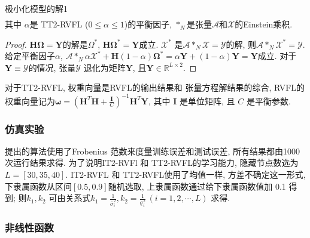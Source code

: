{\begin{mythm}{极小化模型的解}{1}
\begin{align}
\end{align}
其中 $\alpha$是 TT2-RVFL ($0\leq \alpha\leq 1$)的平衡因子, $*_N$是张量$\mathcal A$和$\mathcal X$的Einstein乘积.
\end{mythm}
\begin{proof}
  $\bm H \bm \Omega=\bm Y$的解是$\Omega^*$, $\bm H \bm \Omega^*=\bm Y$成立.
  $\mathcal X^*$ 是$\mathcal A *_N \mathcal X=\mathcal Y$的解, 则$\mathcal A *_N \mathcal X^*=\mathcal Y$.
  给定平衡因子$\alpha$, $\mathcal A *_N  \alpha \mathcal X^*+\bm H (1-\alpha)\bm \Omega^*=\alpha \bm Y+(1-\alpha)\bm Y=\bm Y$成立.
  对于$\bm Y\equiv \mathcal Y$的情况, 张量$\mathcal Y$ 退化为矩阵$\bm Y$, 且$\bm Y\in \mathbb R^{L\times 2}$.
\end{proof}
\begin{remark}
  对于TT2-RVFL, 权重向量是RVFL的输出结果和 张量方程解结果的综合, RVFL的权重向量记为$\bm \omega=(\bm H^T \bm H+\frac {\bm I}  C)^{-1} \bm H^T \bm Y$, 其中 $\bm I$ 是单位矩阵, 且 $C$ 是平衡参数.
\end{remark}

\subsubsection{仿真实验} \label{TensorFLNsection4}
提出的算法使用了Frobenius 范数来度量训练误差和测试误差,  所有结果都由1000次运行结果求得. 为了说明IT2-RVFl 和 TT2-RVFL的学习能力, 隐藏节点数选为$L=[30,35,40]$.
IT2-RVFL 和 TT2-RVFL使用了均值一样, 方差不确定这一形式, 下隶属函数从区间$[0.5,0.9]$随机选取, 上隶属函数通过给下隶属函数值加 0.1 得到; 则$k_1, k_2$ 可由关系式$k_1=\frac{1} {\bar{\sigma} ^2_{i}}, k_2=\frac{1} {\underline{\sigma} ^2_{i}} \,(i=1,2,\cdots, L)$ 求得.
\subsubsection{非线性函数}

}
